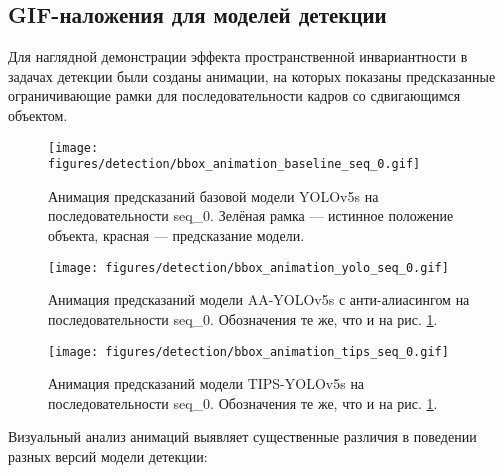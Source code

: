 \subsection{GIF-наложения для моделей детекции}
\label{experiments:dynamic:bbox_animation}

Для наглядной демонстрации эффекта пространственной инвариантности в задачах детекции были созданы анимации, на которых показаны предсказанные ограничивающие рамки для последовательности кадров со сдвигающимся объектом.

\begin{figure}[ht]
\centering
\texttt{[image: figures/detection/bbox\_animation\_baseline\_seq\_0.gif]}
\caption{Анимация предсказаний базовой модели YOLOv5s на последовательности seq\_0. Зелёная рамка — истинное положение объекта, красная — предсказание модели.}
\label{fig:bbox_animation_baseline}
\end{figure}

\begin{figure}[ht]
\centering
\texttt{[image: figures/detection/bbox\_animation\_yolo\_seq\_0.gif]}
\caption{Анимация предсказаний модели AA-YOLOv5s с анти-алиасингом на последовательности seq\_0. Обозначения те же, что и на рис. \ref{fig:bbox_animation_baseline}.}
\label{fig:bbox_animation_aa}
\end{figure}

\begin{figure}[ht]
\centering
\texttt{[image: figures/detection/bbox\_animation\_tips\_seq\_0.gif]}
\caption{Анимация предсказаний модели TIPS-YOLOv5s на последовательности seq\_0. Обозначения те же, что и на рис. \ref{fig:bbox_animation_baseline}.}
\label{fig:bbox_animation_tips}
\end{figure}

Визуальный анализ анимаций выявляет существенные различия в поведении разных версий модели детекции:

